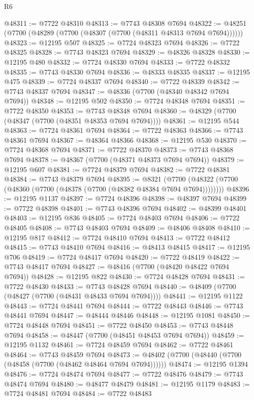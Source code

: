 \begin{lexlean}{R6}
\begin{coremodule}
@48311 := @7722 @48310
@48313 := @7743 @48308 @7694
@48322 := @48251 (@7700 (@48289 (@7700 (@48307 (@7700 (@48311 @48313 @7694 @7694))))))
@48323 := @12195 @507
@48325 := @7724 @48323 @7694
@48326 := @7722 @48325
@48328 := @7743 @48323 @7694
@48329 := @48326 @48328
@48330 := @12195 @480
@48332 := @7724 @48330 @7694
@48333 := @7722 @48332
@48335 := @7743 @48330 @7694
@48336 := @48333 @48335
@48337 := @12195 @475
@48339 := @7724 @48337 @7694
@48340 := @7722 @48339
@48342 := @7743 @48337 @7694
@48347 := @48336 (@7700 (@48340 @48342 @7694 @7694))
@48348 := @12195 @502
@48350 := @7724 @48348 @7694
@48351 := @7722 @48350
@48353 := @7743 @48348 @7694
@48360 := @48329 (@7700 (@48347 (@7700 (@48351 @48353 @7694 @7694))))
@48361 := @12195 @544
@48363 := @7724 @48361 @7694
@48364 := @7722 @48363
@48366 := @7743 @48361 @7694
@48367 := @48364 @48366
@48368 := @12195 @530
@48370 := @7724 @48368 @7694
@48371 := @7722 @48370
@48373 := @7743 @48368 @7694
@48378 := @48367 (@7700 (@48371 @48373 @7694 @7694))
@48379 := @12195 @607
@48381 := @7724 @48379 @7694
@48382 := @7722 @48381
@48384 := @7743 @48379 @7694
@48395 := @8321
    (@7700 (@48322 (@7700 (@48360 (@7700 (@48378 (@7700 (@48382 @48384 @7694 @7694))))))))
@48396 := @12195 @1137
@48397 := @7724 @48396
@48398 := @48397 @7694
@48399 := @7722 @48398
@48401 := @7743 @48396 @7694
@48402 := @48399 @48401
@48403 := @12195 @836
@48405 := @7724 @48403 @7694
@48406 := @7722 @48405
@48408 := @7743 @48403 @7694
@48409 := @48406 @48408
@48410 := @12195 @817
@48412 := @7724 @48410 @7694
@48413 := @7722 @48412
@48415 := @7743 @48410 @7694
@48416 := @48413 @48415
@48417 := @12195 @706
@48419 := @7724 @48417 @7694
@48420 := @7722 @48419
@48422 := @7743 @48417 @7694
@48427 := @48416 (@7700 (@48420 @48422 @7694 @7694))
@48428 := @12195 @822
@48430 := @7724 @48428 @7694
@48431 := @7722 @48430
@48433 := @7743 @48428 @7694
@48440 := @48409 (@7700 (@48427 (@7700 (@48431 @48433 @7694 @7694))))
@48441 := @12195 @1122
@48443 := @7724 @48441 @7694
@48444 := @7722 @48443
@48446 := @7743 @48441 @7694
@48447 := @48444 @48446
@48448 := @12195 @1081
@48450 := @7724 @48448 @7694
@48451 := @7722 @48450
@48453 := @7743 @48448 @7694
@48458 := @48447 (@7700 (@48451 @48453 @7694 @7694))
@48459 := @12195 @1132
@48461 := @7724 @48459 @7694
@48462 := @7722 @48461
@48464 := @7743 @48459 @7694
@48473 := @48402 (@7700 (@48440 (@7700 (@48458 (@7700 (@48462 @48464 @7694 @7694))))))
@48474 := @12195 @1394
@48476 := @7724 @48474 @7694
@48477 := @7722 @48476
@48479 := @7743 @48474 @7694
@48480 := @48477 @48479
@48481 := @12195 @1179
@48483 := @7724 @48481 @7694
@48484 := @7722 @48483

\end{coremodule}
\end{lexlean}

